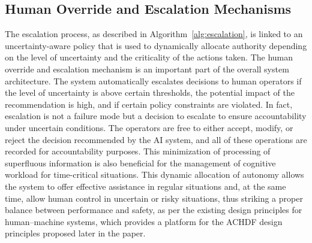 \documentclass[journal]{IEEEtran}
\theoremstyle{plain}
\theoremstyle{definition}
\begin{document}
\subsection{Human Override and Escalation Mechanisms}
The escalation process, as described in Algorithm~\ref{alg:escalation}, is linked to an uncertainty-aware policy that is used to dynamically allocate authority depending on the level of uncertainty and the criticality of the actions taken. The human override and escalation mechanism is an important part of the overall system architecture.
The system automatically escalates decisions to human operators if the level of uncertainty is above certain thresholds, the potential impact of the recommendation is high, and if certain policy constraints are violated. In fact, escalation is not a failure mode but a decision to escalate to ensure accountability under uncertain conditions.
The operators are free to either accept, modify, or reject the decision recommended by the AI system, and all of these operations are recorded for accountability purposes. This minimization of processing of superfluous information is also beneficial for the management of cognitive workload for time-critical situations.
This dynamic allocation of autonomy allows the system to offer effective assistance in regular situations and, at the same time, allow human control in uncertain or risky situations, thus striking a proper balance between performance and safety, as per the existing design principles for human--machine systems, which provides a platform for the ACHDF design principles proposed later in the paper.
\end{document}
